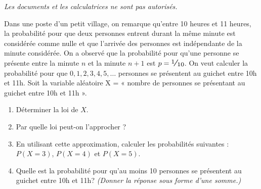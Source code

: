 \documentclass[12pt,reqno]{amsart}
\begin{document}
\ifsolutions\else
\textit{Les documents et les calculatrices ne sont pas autorisés.}
\vspace{7mm}
\fi

\bigskip

\begin{exo}

  Dans une poste d'un petit village, on remarque qu'entre 10 heures et 11 heures, la probabilité pour que deux personnes entrent durant la même minute est considérée comme nulle et que l'arrivée des personnes est indépendante de la minute considérée.\newline
  On a observé que la probabilité pour qu'une personne se présente entre la minute $n$ et la minute $n+1$ est $p = \dsfrac{1}{10}$.\newline
  On veut calculer la probabilité pour que $0,1,2,3,4,5,\dots$ personnes se présentent au guichet entre 10h et 11h.\newline
  Soit la variable aléatoire X = « nombre de personnes se présentant au guichet entre 10h et 11h ».
  \begin{enumerate}
    \item Déterminer la loi de  $X$.
    \item  Par quelle loi peut-on l'approcher ?
    \item En utilisant cette approximation, calculer les probabilités suivantes :\\
    $P(X=3)$, $P(X=4)$ et $P(X=5)$.

    \item Quelle est la probabilité pour qu'au moins 10 personnes se présentent au guichet entre 10h et 11h? \emph{(Donner la réponse sous forme d'une somme.)}
  \end{enumerate}
\end{exo}

\tsvp
\newpage
\end{document}
